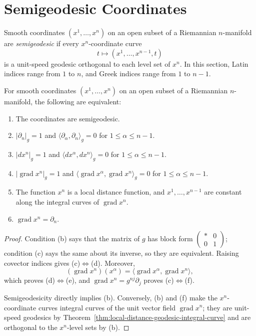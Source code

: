 \section{Semigeodesic Coordinates}

Smooth coordinates $(x^1,\ldots,x^n)$ on an open subset of a Riemannian
$n$-manifold are \emph{semigeodesic} if every $x^n$-coordinate curve
\[
t\longmapsto(x^1,\ldots,x^{n-1},t)
\]
is a unit-speed geodesic orthogonal to each level set of $x^n$. In this
section, Latin indices range from $1$ to $n$, and Greek indices range from
$1$ to $n-1$.

\begin{proposition}
\label{prop:characterizations-semigeodetic-coordinates}


For smooth coordinates $(x^1,\ldots,x^n)$ on an open subset of a Riemannian
$n$-manifold, the following are equivalent:
\begin{enumerate}
\item[(a)] The coordinates are semigeodesic.
\item[(b)] $|\partial_n|_g=1$ and
$\langle\partial_\alpha,\partial_n\rangle_g=0$ for
$1\leq\alpha\leq n-1$.
\item[(c)] $|dx^n|_g=1$ and
$\langle dx^\alpha,dx^n\rangle_g=0$ for
$1\leq\alpha\leq n-1$.
\item[(d)] $|\operatorname{grad}x^n|_g=1$ and
$\langle\operatorname{grad}x^\alpha,\operatorname{grad}x^n\rangle_g=0$ for
$1\leq\alpha\leq n-1$.
\item[(e)] The function $x^n$ is a local distance function, and
$x^1,\ldots,x^{n-1}$ are constant along the integral curves of
$\operatorname{grad}x^n$.
\item[(f)] $\operatorname{grad}x^n=\partial_n$.
\end{enumerate}
\end{proposition}

\begin{proof}
\sketch Condition (b) says that the matrix of $g$ has block form
$\left(\begin{smallmatrix} *&0\\0&1\end{smallmatrix}\right)$; condition (c)
says the same about its inverse, so they are equivalent. Raising covector
indices gives (c)$\Leftrightarrow$(d). Moreover,
\[
(\operatorname{grad}x^n)(x^\alpha)
=\langle\operatorname{grad}x^\alpha,\operatorname{grad}x^n\rangle,
\]
which proves (d)$\Leftrightarrow$(e), and
$\operatorname{grad}x^n=g^{nj}\partial_j$ proves
(c)$\Leftrightarrow$(f).

Semigeodesicity directly implies (b). Conversely, (b) and (f) make the
$x^n$-coordinate curves integral curves of the unit vector field
$\operatorname{grad}x^n$; they are unit-speed geodesics by
Theorem~\ref{thm:local-distance-geodesic-integral-curve} and are orthogonal to
the $x^n$-level sets by (b).
\end{proof}

